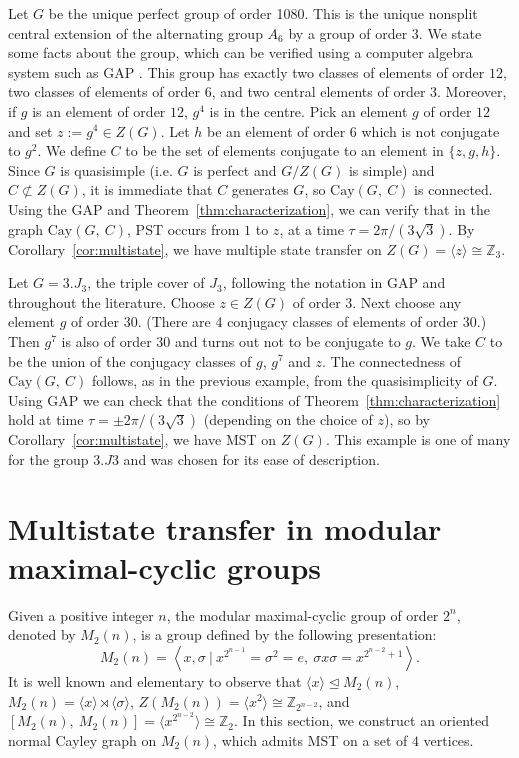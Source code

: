\documentclass{amsart}
\theoremstyle{plain}
\theoremstyle{remark}\newtheorem{con}[theorem]{Construction}
\theoremstyle{remark} \newtheorem*{remark}{Remark}
\theoremstyle{remark} \newtheorem{example}{Example}
\newcommand{\bb}{\mathbb}
\newcommand{\mrm}{\mathrm}
\begin{document}
Let $G$ be the unique perfect group of order 1080. This is the unique nonsplit central extension of the alternating group $A_{6}$ by a group of order 3. We state some facts about the group, which can be verified using a computer algebra system such as GAP \cite{GAP4}. This group has exactly two classes of elements of order $12$, two classes of elements of order $6$, and two central elements of order $3$. Moreover, if $g$ is an element of order $12$, $g^{4}$ is in the centre. Pick an element $g$ of order $12$ and set $z:=g^{4} \in Z(G)$. Let $h$ be an element of order $6$ which is not conjugate to $g^2$. We define $C$ to be the set of elements conjugate to an element in  $\{z,g, h\}$. Since $G$ is quasisimple (i.e. $G$ is perfect and $G/Z(G)$ is simple) and $C\nsubset Z(G)$, it is immediate that $C$ generates $G$, so $\mrm{Cay}(G,\ C)$ is connected.
Using the GAP and Theorem~\ref{thm:characterization}, we can verify that in the graph $\mrm{Cay}(G,\ C)$, PST occurs from $1$ to $z$, at a time $\tau = 2\pi/(3\sqrt{3})$. By Corollary~\ref{cor:multistate}, we have multiple state transfer on $Z(G)=\langle z \rangle\cong \bb{Z}_{3}$.   


Let $G=3.J_3$, the triple cover of $J_3$, following
the notation in GAP and throughout the literature. 
Choose $z\in Z(G)$ of order 3. Next choose any element
$g$ of order 30. (There are 4 conjugacy classes of
elements of order 30.) Then $g^7$ is also of order 30 
and turns out not to be conjugate to $g$.
We take $C$ to be the union of
the conjugacy classes of $g$, $g^7$ and $z$.
The connectedness  of $\mrm{Cay}(G,\ C)$ follows, as in the previous example, from the quasisimplicity of $G$.
Using GAP we can check  that the conditions of Theorem~\ref{thm:characterization} hold at time
$\tau = \pm2\pi/(3\sqrt{3})$ (depending on the choice of $z$), so by Corollary~\ref{cor:multistate}, we have MST on $Z(G)$. This example is one of many
for the group $3.J3$ and was chosen for its ease of description. 



\section{Multistate transfer in modular maximal-cyclic groups}\label{sec:modular2gps}
Given a positive integer $n$, the modular maximal-cyclic group of order $2^n$, denoted by $M_{2}(n)$, is a group defined by the following presentation:
\[M_{2}(n) =\left\langle x,\sigma\ \big\lvert \ x^{2^{n-1}}=\sigma^2=e,\ \sigma x \sigma =x^{2^{n-2}+1} \right\rangle.\] It is well known and elementary to observe that $\langle x \rangle \trianglelefteq M_{2}(n)$, $M_{2}(n) = \langle x \rangle \rtimes \langle \sigma \rangle $, $Z(M_{2}(n))= \langle x^2 \rangle \cong \bb{Z}_{2^{n-2}}$, and $[M_{2}(n),\ M_{2}(n)] =\langle x^{2^{n-2}} \rangle \cong \bb{Z}_{2}$. In this section, we construct an oriented normal Cayley graph on $M_{2}(n)$, which admits MST on a set of $4$ vertices. 
\end{document}
